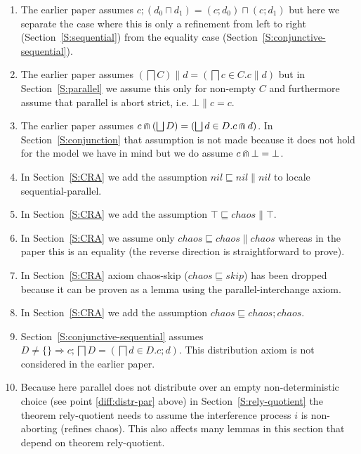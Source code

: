 \documentclass[12pt,a4paper]{article}
\newcommand{\Seq}{\mathbin{;}}
\newcommand{\refsto}{\mathrel{\sqsubseteq}}
\newcommand{\nondet}{\mathbin{\sqcap}}
\newcommand{\Nondet}{\mathop{\bigsqcap}}
\newcommand{\together}{\mathbin{\doublecap}}
\begin{document}
\begin{enumerate}
\item
The earlier paper assumes $c \Seq (d_0 \nondet d_1) = (c \Seq d_0) \nondet (c \Seq d_1)$
but here we separate the case where this is only a refinement from left to right (Section~\ref{S:sequential})
from the equality case (Section~\ref{S:conjunctive-sequential}).
\item\label{diff:distr-par}
The earlier paper assumes $(\Nondet C) \parallel d = (\Nondet c \in C . c \parallel d)$
but in Section~\ref{S:parallel}  we assume this only for non-empty $C$ and furthermore assume 
that parallel is abort strict, i.e. $\bot \parallel c = c$.
\item
The earlier paper assumes $c \together (\bigsqcup D) = (\bigsqcup d \in D . c \together d)$.
In Section~\ref{S:conjunction} that assumption is not made
because it does not hold for the model we have in mind \cite{DaSMfaWSLwC}
but we do assume $c \together \bot = \bot$.
\item
In Section~\ref{S:CRA} we add the assumption $nil \refsto nil \parallel nil$ to locale sequential-parallel.
\item
In Section~\ref{S:CRA} we add the assumption $\top \refsto chaos \parallel \top$.
\item
In Section~\ref{S:CRA} we assume only $chaos \refsto chaos \parallel chaos$
whereas in the paper this is an equality (the reverse direction is straightforward to prove).
\item
In Section~\ref{S:CRA} axiom chaos-skip ($chaos \refsto skip$) has been dropped
because it can be proven as a lemma using the parallel-interchange axiom.
\item
In Section~\ref{S:CRA} we add the assumption $chaos \refsto chaos \Seq chaos$.
\item
Section~\ref{S:conjunctive-sequential} assumes
$D \neq \{\} \Rightarrow c \Seq \Nondet D = (\Nondet d \in D . c \Seq d)$.
This distribution axiom is not considered in the earlier paper.
\item
Because here parallel does not distribute over an empty non-deterministic choice
(see point \ref{diff:distr-par} above)
in Section~\ref{S:rely-quotient} the theorem rely-quotient needs to assume the interference process $i$
is non-aborting (refines chaos). This also affects many lemmas in this section that depend on 
theorem rely-quotient.
\end{enumerate}




\end{document}
